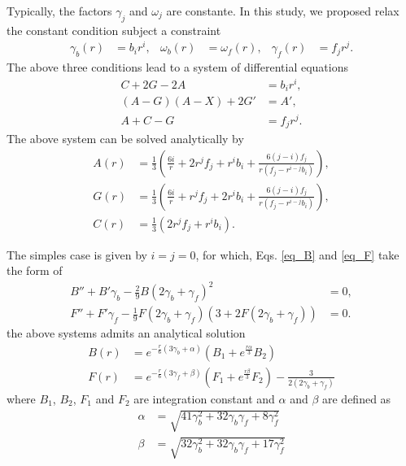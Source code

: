 \documentclass{article}
\begin{document}
Typically, the factors $\gamma_j$ and $\omega_j$ are constante. In this study, we proposed
relax the constant condition subject a constraint
\begin{align}
    \gamma_b(r) & = b_ir^{i}, & \omega_b(r) & = \omega_f(r), & \gamma_f(r) & = f_jr^{j}.
\end{align}
The above three conditions lead to a system of differential equations
\begin{align}
    C + 2G - 2A & = b_ir^{i}, \\
    \left(A - G\right)\left(A - X\right) + 2G' & = A',\\
    A + C - G & = f_jr^{j}.
\end{align}
The above system can be solved analytically by
\begin{align}
    A(r) & = \frac{1}{3}\left(\frac{6i}{r} + 2r^{j}f_j + r^{i}b_i + \frac{6\left(j - i\right)f_j}{r\left(f_j - r^{i - j}b_i\right)}\right), \\
    G(r) & = \frac{1}{3}\left(\frac{6i}{r} + r^{j}f_j + 2r^{i}b_i + \frac{6\left(j - i\right)f_j}{r\left(f_j - r^{i - j}b_i\right)}\right), \\
    C(r) & = \frac{1}{3}\left(2r^{j}f_j + r^{i}b_i\right).
\end{align}

The simples case is given by $i = j = 0$, for which, Eqs. \eqref{eq_B} and \eqref{eq_F} take the form
of
\begin{align}
    B'' + B'\gamma_b - \frac{2}{9}B\left(2\gamma_b + \gamma_f\right)^2 & = 0, \\ 
    F'' + F'\gamma_f - \frac{1}{9}F\left(2\gamma_b + \gamma_f\right)\left(3 + 2F\left(2\gamma_b + \gamma_f\right)\right) & = 0.
\end{align}
the above systems admits an analytical solution
\begin{align}
    B(r) & = e^{-\frac{r}{6}\left(3\gamma_b + \alpha\right)}\left(B_1 + e^{\frac{r\alpha}{3}}B_2\right) \\
    F(r) & = e^{-\frac{r}{6}\left(3\gamma_f + \beta\right)}\left(F_1 + e^{\frac{r\beta}{3}}F_2\right) - \frac{3}{2\left(2\gamma_b + \gamma_f\right)}
\end{align}
where $B_1$, $B_2$, $F_1$ and $F_2$ are integration constant and $\alpha$ and $\beta$ are defined as 
\begin{align}
    \alpha & = \sqrt{41\gamma_b^2 + 32\gamma_b\gamma_f + 8\gamma_f^2} \\
    \beta  & = \sqrt{32\gamma_b^2 + 32\gamma_b\gamma_f + 17\gamma_f^2} 
\end{align}
\end{document}

